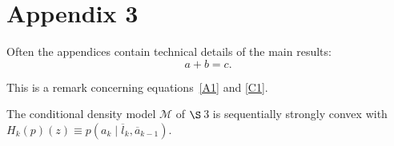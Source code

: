 \documentclass[lineno]{biometrika}
\begin{document}
\vspace*{-10pt}
\appendixthree
\section*{Appendix 3}

Often the appendices contain technical details of the main results:
\begin{equation}
\label{C1}
a + b = c.
\end{equation}

\begin{remark}
This is a remark concerning equations~\eqref{A1} and \eqref{C1}.
\end{remark}

\begin{lemma}\label{facstrong}
The conditional density model $\mathcal{M}$ of $\S$\,3 is sequentially strongly convex with $H_{k}(p)\left( z\right)
\equiv p\left( a_{k}\mid \overline{l}_{k},\overline{a}_{k-1}\right) $.\vspace*{-10pt}
\end{lemma}



\end{document}
